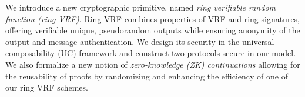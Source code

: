 
\def\eprintsmallskip{\smallskip}{}%
We introduce a new cryptographic primitive,  named
\emph{ring verifiable random function (ring VRF)}. Ring VRF combines properties of VRF  and ring signatures, offering verifiable unique, pseudorandom outputs while ensuring  anonymity of the output and message authentication. We design its security in the universal composability (UC) framework and construct two protocols secure in our model.
We also formalize a new notion of \emph{zero-knowledge (ZK) continuations} allowing for the reusability of proofs by randomizing and enhancing the efficiency of one of our ring VRF schemes.

%


